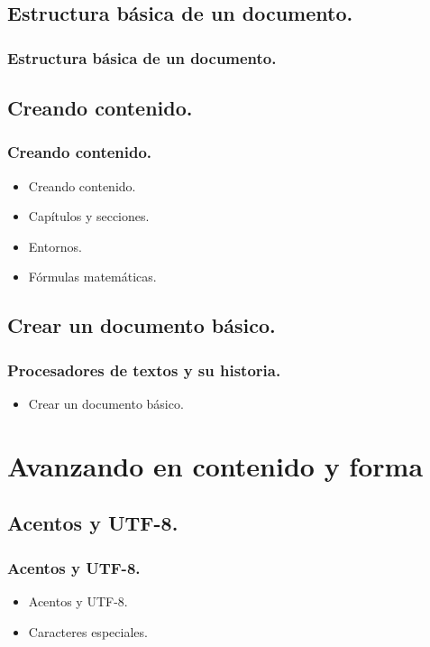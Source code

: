 \documentclass{beamer}
\begin{document}
\subsection{Estructura básica de un documento.}
\begin{frame}
  \frametitle{Estructura básica de un documento.}
\end{frame}

\subsection{Creando contenido.}
\begin{frame}
  \frametitle{Creando contenido.}
  \begin{itemize}
  \item<1->{Creando contenido.}
  \item<2->{Capítulos y secciones.}
  \item<3->{Entornos.}
  \item<4->{Fórmulas matemáticas.}
  \end{itemize}
\end{frame}

\subsection{Crear un documento básico.}
\begin{frame}
  \frametitle{Procesadores de textos y su historia.}
  \begin{itemize}
  \item<1->{Crear un documento básico.}
  \end{itemize}
\end{frame}

\section{Avanzando en contenido y forma}
\subsection{Acentos y UTF-8.}
\begin{frame}
  \frametitle{Acentos y UTF-8.}
  \begin{itemize}
   \item<1->{Acentos y UTF-8.}
   \item<2->{Caracteres especiales.}
  \end{itemize}
\end{frame}
\end{document}
